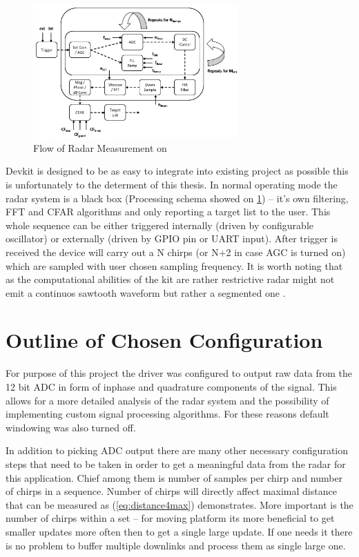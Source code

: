 \begin{figure}[h!]
	\centering
	\includegraphics[width=0.7\textwidth]{../img/sidar_flow.png}
	\caption[Flow of Radar Measurement on \sidar \cite{sidarPRO}]{Flow of Radar Measurement on \sidar}
	\label{fig:sidarFlow}
\end{figure}

Devkit is designed to be as easy to integrate into existing project as possible this is unfortunately to the determent of this thesis.
In normal operating mode the radar system is a black box (Processing schema showed on \ref{fig:sidarFlow}) -- it's own filtering, FFT and CFAR algorithms and only reporting a target list to the user.
This whole sequence can be either triggered internally (driven by configurable oscillator) or externally (driven by GPIO pin or UART input).
After trigger is received the device will carry out a N chirps (or N+2 in case AGC is turned on) which are sampled with user chosen sampling frequency.
It is worth noting that as the computational abilities of the kit are rather restrictive radar might not emit a continuos sawtooth waveform but rather a segmented one \cite{sidarPRO}.

\section{Outline of Chosen Configuration }


For purpose of this project the driver was configured to output raw data from the 12 bit ADC in form of inphase and quadrature components of the signal.
This allows for a more detailed analysis of the radar system and the possibility of implementing custom signal processing algorithms.
For these reasons default windowing was also turned off.

In addition to picking ADC output there are many other necessary configuration steps that need to be taken in order to get a meaningful data from the radar for this application.
Chief among them is number of samples per chirp and number of chirps in a sequence.
Number of chirps will directly affect maximal distance that can be measured as (\ref{eq:distance4max}) demonstrates.
More important is the number of chirps within a set -- for moving platform its more beneficial to get smaller updates more often then to get a single large update.
If one needs it there is no problem to buffer multiple downlinks and process them as single large one.

